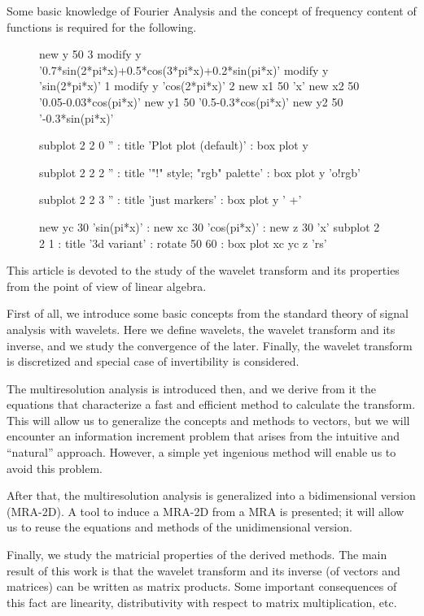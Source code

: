 \documentclass[letterpaper,10pt]{article}
\begin{document}
  Some basic knowledge of Fourier Analysis and the concept of frequency content of functions is required for the following.
  \begin{figure}[!ht]
    \centering
    \begin{mgl}[scale=0.7]
      new y 50 3
      modify y '0.7*sin(2*pi*x)+0.5*cos(3*pi*x)+0.2*sin(pi*x)'
      modify y 'sin(2*pi*x)' 1
      modify y 'cos(2*pi*x)' 2
      new x1 50 'x'
      new x2 50 '0.05-0.03*cos(pi*x)'
      new y1 50 '0.5-0.3*cos(pi*x)'
      new y2 50 '-0.3*sin(pi*x)'
      
      subplot 2 2 0 '' : title 'Plot plot (default)' : box
      plot y
      
      subplot 2 2 2 '' : title '"!" style; "rgb" palette' : box
      plot y 'o!rgb'
      
      subplot 2 2 3 '' : title 'just markers' : box
      plot y ' +'
      
      new yc 30 'sin(pi*x)' : new xc 30 'cos(pi*x)' : new z 30 'x'
      subplot 2 2 1 : title '3d variant' : rotate 50 60 : box
      plot xc yc z 'rs'
    \end{mgl}
  \end{figure}
  
  \noindent This article is devoted to the study of the wavelet transform and its properties from the point of view of linear algebra.
  
  First of all, we introduce some basic concepts from the standard theory of signal analysis with wavelets. Here we define wavelets, the wavelet transform and its inverse, and we study the convergence of the later. Finally, the wavelet transform is discretized and special case of invertibility is considered.
  
  The multiresolution analysis is introduced then, and we derive from it the equations that characterize a fast and efficient method to calculate the transform. This will allow us to generalize the concepts and methods to vectors, but we will encounter an information increment problem that arises from the intuitive and ``natural'' approach. However, a simple yet ingenious method will enable us to avoid this problem.
  
  After that, the multiresolution analysis is generalized into a bidimensional version (MRA-2D). A tool to induce a MRA-2D from a MRA is presented; it will allow us to reuse the equations and methods of the unidimensional version.
  
  Finally, we study the matricial properties of the derived methods. The main result of this work is that the wavelet transform and its inverse (of vectors and matrices) can be written as matrix products. Some important consequences of this fact are linearity, distributivity with respect to matrix multiplication, etc.
  
\end{document}
